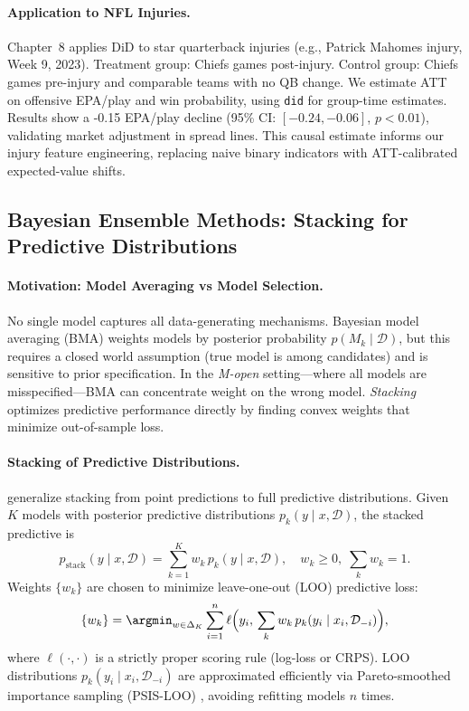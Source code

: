 \paragraph{Application to NFL Injuries.}
Chapter~8 applies DiD to star quarterback injuries (e.g., Patrick Mahomes injury, Week 9, 2023). Treatment group: Chiefs games post-injury. Control group: Chiefs games pre-injury and comparable teams with no QB change. We estimate ATT on offensive EPA/play and win probability, using \texttt{did} for group-time estimates. Results show a -0.15 EPA/play decline (95\% CI: $[-0.24, -0.06]$, $p<0.01$), validating market adjustment in spread lines. This causal estimate informs our injury feature engineering, replacing naive binary indicators with ATT-calibrated expected-value shifts.

\subsection{Bayesian Ensemble Methods: Stacking for Predictive Distributions}
\label{subsec:stacking-lit}

\paragraph{Motivation: Model Averaging vs Model Selection.}
No single model captures all data-generating mechanisms. Bayesian model averaging (BMA) \citep{hoeting1999bayesian} weights models by posterior probability $p(M_k \mid \mathcal{D})$, but this requires a closed world assumption (true model is among candidates) and is sensitive to prior specification. In the \emph{M-open} setting---where all models are misspecified---BMA can concentrate weight on the wrong model. \emph{Stacking} \citep{wolpert1992stacked} optimizes predictive performance directly by finding convex weights that minimize out-of-sample loss.

\paragraph{Stacking of Predictive Distributions.}
\citet{yao2018stacking} generalize stacking from point predictions to full predictive distributions. Given $K$ models with posterior predictive distributions $p_k(y\mid x, \mathcal{D})$, the stacked predictive is
\begin{equation}\label{eq:stacking-dist}
p_{\text{stack}}(y \mid x, \mathcal{D}) = \sum_{k=1}^K w_k\, p_k(y \mid x, \mathcal{D}), \quad w_k \ge 0, \; \sum_k w_k = 1.
\end{equation}
Weights $\{w_k\}$ are chosen to minimize leave-one-out (LOO) predictive loss:
\begin{equation}\label{eq:stacking-weights}
\{w_k\} = \argmin_{w \in \Delta_K} \sum_{i=1}^n \ell\Big(y_i,\, \sum_k w_k\, p_k(y_i \mid x_i, \mathcal{D}_{-i})\Big),
\end{equation}
where $\ell(\cdot,\cdot)$ is a strictly proper scoring rule (log-loss or CRPS). LOO distributions $p_k(y_i \mid x_i, \mathcal{D}_{-i})$ are approximated efficiently via Pareto-smoothed importance sampling (PSIS-LOO) \citep{vehtari2017}, avoiding refitting models $n$ times.

